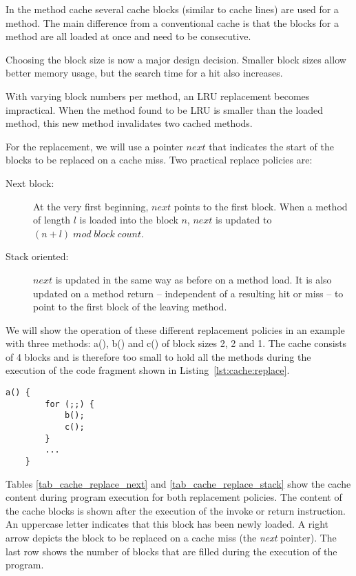 In the method cache several cache blocks (similar to cache lines) are
used for a method. The main difference from a conventional cache is
that the blocks for a method are all loaded at once and need to be
consecutive.

Choosing the block size is now a major design decision. Smaller
block sizes allow better memory usage, but the search time for a hit
also increases.

With varying block numbers per method, an LRU replacement becomes
impractical. When the method found to be LRU is smaller than the
loaded method, this new method invalidates two cached methods.

For the replacement, we will use a pointer $next$ that indicates the
start of the blocks to be replaced on a cache miss. Two practical
replace policies are:
%
\begin{description}
\item [Next block:]At the very first beginning, $next$ points to the
first block. When a method of length $l$ is loaded into the block
$n$, $next$ is updated to $(n+l)\;mod\;block\;count$.
\item [Stack oriented:]$next$ is updated in the same way as before
on a method load. It is also updated on a method return --
independent of a resulting hit or miss -- to point to the first
block of the leaving method.
\end{description}
%
We will show the operation of these different replacement policies
in an example with three methods: a(), b() and c() of block sizes 2,
2 and 1. The cache consists of 4 blocks and is therefore too small
to hold all the methods during the execution of the code fragment
shown in Listing~\ref{lst:cache:replace}.
%
\begin{samepage}
\begin{lstlisting}[float,caption={Code fragment for the replacement example},
label=lst:cache:replace]
    a() {
        for (;;) {
            b();
            c();
        }
        ...
    }
\end{lstlisting}
\end{samepage}
%
Tables \ref{tab_cache_replace_next} and
\ref{tab_cache_replace_stack} show the cache content during program
execution for both replacement policies. The content of the cache
blocks is shown after the execution of the invoke or return
instruction. An uppercase letter indicates that this block has been
newly loaded. A right arrow depicts the block to be replaced on a
cache miss (the \emph{next} pointer). The last row shows the number
of blocks that are filled during the execution of the program.


